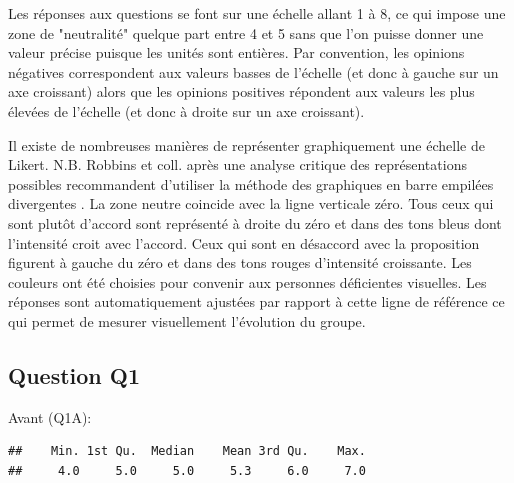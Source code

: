\documentclass[12pt,english,french]{article}\usepackage{graphicx, color}
\makeatletter
\newenvironment{kframe}{%
 \def\at@end@of@kframe{}%
 \ifinner\ifhmode%
  \def\at@end@of@kframe{\end{minipage}}%
  \begin{minipage}{\columnwidth}%
 \fi\fi%
 \def\FrameCommand##1{\hskip\@totalleftmargin \hskip-\fboxsep
 \colorbox{shadecolor}{##1}\hskip-\fboxsep
     \hskip-\linewidth \hskip-\@totalleftmargin \hskip\columnwidth}%
 \MakeFramed {\advance\hsize-\width
   \@totalleftmargin\z@ \linewidth\hsize
   \@setminipage}}%
 {\par\unskip\endMakeFramed%
 \at@end@of@kframe}
\newenvironment{knitrout}{}{} %
\makeatother
\begin{document}
Les réponses aux questions se font sur une échelle allant 1 à 8, ce qui impose une zone de "neutralité" quelque part entre 4 et 5 sans que l'on puisse donner une valeur précise puisque les unités sont entières. Par convention, les opinions négatives correspondent aux valeurs basses de l'échelle (et donc à gauche sur un axe croissant) alors que les opinions positives répondent aux valeurs les plus élevées de l'échelle (et donc à droite sur un axe croissant).

Il existe de nombreuses manières de représenter graphiquement une échelle de Likert. N.B. Robbins et coll. après une analyse critique des représentations possibles recommandent d'utiliser la méthode des graphiques en barre empilées divergentes \cite{1}.
La zone neutre coincide avec la ligne verticale zéro. Tous ceux qui sont plutôt d'accord sont représenté à droite du zéro et dans des tons bleus dont l'intensité croit avec l'accord. Ceux qui sont en désaccord avec la proposition figurent à gauche du zéro et dans des tons rouges d'intensité croissante. Les couleurs ont été choisies pour convenir aux personnes déficientes visuelles. Les réponses sont automatiquement ajustées par rapport à cette ligne de référence ce qui permet de mesurer visuellement l'évolution du groupe.

\subsection{Question Q1}



Avant (Q1A):
\begin{knitrout}
\color{fgcolor}\begin{kframe}
\begin{verbatim}
##    Min. 1st Qu.  Median    Mean 3rd Qu.    Max. 
##     4.0     5.0     5.0     5.3     6.0     7.0
\end{verbatim}
\end{kframe}
\end{knitrout}
\end{document}
